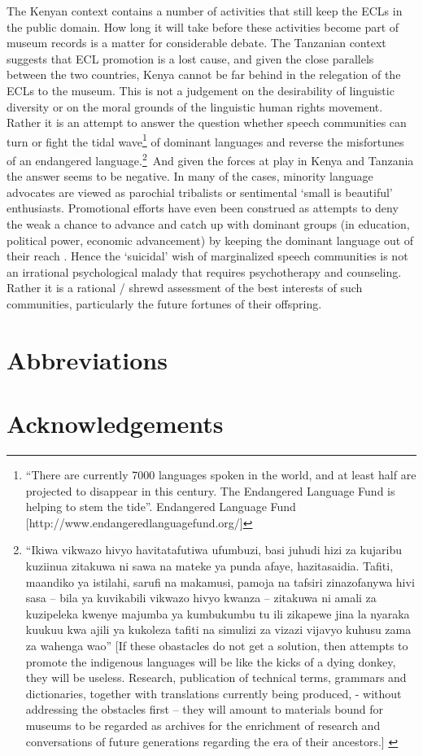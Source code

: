\documentclass[output=paper,colorlinks,citecolor=brown]{langscibook}
\begin{document}
The Kenyan context contains a number of activities that still keep the ECLs in the public domain. How long it will take before these activities become part of museum records is a matter for considerable debate. The Tanzanian context suggests that ECL promotion is a lost cause, and given the close parallels between the two countries, Kenya cannot be far behind in the relegation of the ECLs to the museum. This is not a judgement on the desirability of linguistic diversity or on the moral grounds of the linguistic human rights movement. Rather it is an attempt to answer the question whether speech communities can turn or fight the tidal wave\footnote{“There are currently 7000 languages spoken in the world, and at least half are projected to disappear in this century. The Endangered Language Fund is helping to stem the tide”. Endangered Language Fund [http://www.endangeredlanguagefund.org/]} of dominant languages and reverse the misfortunes of an endangered language.\footnote{“Ikiwa vikwazo hivyo havitatafutiwa ufumbuzi, basi juhudi hizi za kujaribu kuziinua zitakuwa ni sawa na mateke ya punda afaye, hazitasaidia. Tafiti, maandiko ya istilahi, sarufi na makamusi, pamoja na tafsiri zinazofanywa hivi sasa – bila ya kuvikabili vikwazo hivyo kwanza – zitakuwa ni amali za kuzipeleka kwenye majumba ya kumbukumbu tu ili zikapewe jina la nyaraka kuukuu kwa ajili ya kukoleza tafiti na simulizi za vizazi vijavyo kuhusu zama za wahenga wao” 
[If these obastacles do not get a solution, then attempts to promote the indigenous languages will be like the kicks of a dying donkey, they will  be useless. Research, publication of technical terms, grammars and dictionaries, together with translations currently being produced, - without addressing the obstacles first – they will amount to materials bound for museums to be regarded as archives for the enrichment of research and conversations of future generations regarding the era of their ancestors.] \citep[99]{Madumulla2007}}~And given the forces at play in Kenya and Tanzania the answer seems to be negative. In many of the cases, minority language advocates are viewed as parochial tribalists or sentimental ‘small is beautiful’ enthusiasts. Promotional efforts have even been construed as attempts to deny the weak a chance to advance and catch up with dominant groups (in education, political power, economic advancement) by keeping the dominant language out of their reach \citep{Mkude2002}. Hence the ‘suicidal’ wish of marginalized speech communities is not an irrational psychological malady that requires psychotherapy and counseling. Rather it is a rational / shrewd assessment of the best interests of such communities, particularly the future fortunes of their offspring.


\section*{Abbreviations}

\section*{Acknowledgements}


\printbibliography[heading=subbibliography,notkeyword=this]
\end{document}
